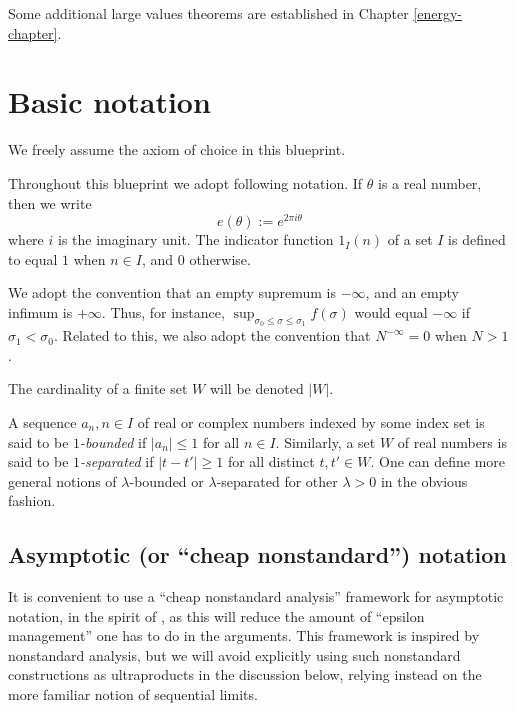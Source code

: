 Some additional large values theorems are established in Chapter \ref{energy-chapter}.


\chapter{Basic notation}\label{notation-chapter}

We freely assume the axiom of choice in this blueprint.

Throughout this blueprint we adopt following notation. If $\theta$ is a real number, then we write
$$ e(\theta) := e^{2\pi i\theta}$$
where $i$ is the imaginary unit. The indicator function $1_I(n)$ of a set $I$ is defined to equal $1$ when $n \in I$, and $0$ otherwise.

We adopt the convention that an empty supremum is $-\infty$, and an empty infimum is $+\infty$.  Thus, for instance, $\sup_{\sigma_0 \leq \sigma \leq \sigma_1} f(\sigma)$ would equal $-\infty$ if $\sigma_1 < \sigma_0$.  Related to this, we also adopt the convention that $N^{-\infty}=0$ when $N > 1$.

The cardinality of a finite set $W$ will be denoted $|W|$.

A sequence $a_n, n \in I$ of real or complex numbers indexed by some index set is said to be \emph{$1$-bounded} if $|a_n| \leq 1$ for all $n \in I$.  Similarly, a set $W$ of real numbers is said to be \emph{$1$-separated} if $|t-t'| \geq 1$ for all distinct $t,t' \in W$.  One can define more general notions of $\lambda$-bounded or $\lambda$-separated for other $\lambda>0$ in the obvious fashion.

\section{Asymptotic (or ``cheap nonstandard'') notation}

It is convenient to use a ``cheap nonstandard analysis'' framework for asymptotic notation, in the spirit of \cite{tao-cheap}, as this will reduce the amount of ``epsilon management'' one has to do in the arguments.  This framework is inspired by nonstandard analysis, but we will avoid explicitly using such nonstandard constructions as ultraproducts in the discussion below, relying instead on the more familiar notion of sequential limits.

